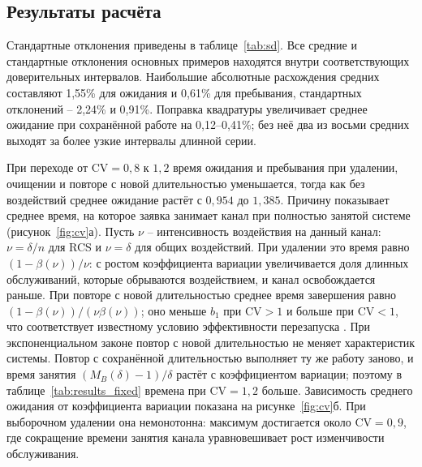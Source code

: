 \subsection{Результаты расчёта}



Стандартные отклонения приведены в таблице~\ref{tab:sd}. Все средние и стандартные отклонения основных примеров находятся внутри соответствующих доверительных интервалов. Наибольшие абсолютные расхождения средних составляют 1,55\% для ожидания и 0,61\% для пребывания, стандартных отклонений -- 2,24\% и 0,91\%. Поправка квадратуры увеличивает среднее ожидание при сохранённой работе на 0,12--0,41\%; без неё два из восьми средних выходят за более узкие интервалы длинной серии.

При переходе от \(\mathrm{CV}=0{,}8\) к \(1{,}2\) время ожидания и пребывания при удалении, очищении и повторе с новой длительностью уменьшается, тогда как без воздействий среднее ожидание растёт с \(0{,}954\) до \(1{,}385\). Причину показывает среднее время, на которое заявка занимает канал при полностью занятой системе (рисунок~\ref{fig:cv}а). Пусть \(\nu\) -- интенсивность воздействия на данный канал: \(\nu=\delta/n\) для RCS и \(\nu=\delta\) для общих воздействий. При удалении это время равно \((1-\beta(\nu))/\nu\): с ростом коэффициента вариации увеличивается доля длинных обслуживаний, которые обрываются воздействием, и канал освобождается раньше. При повторе с новой длительностью среднее время завершения равно \((1-\beta(\nu))/(\nu\beta(\nu))\); оно меньше \(b_1\) при \(\mathrm{CV}>1\) и больше при \(\mathrm{CV}<1\), что соответствует известному условию эффективности перезапуска \cite{pal2017,bonomo2022}. При экспоненциальном законе повтор с новой длительностью не меняет характеристик системы. Повтор с сохранённой длительностью выполняет ту же работу заново, и время занятия \((M_B(\delta)-1)/\delta\) растёт с коэффициентом вариации; поэтому в таблице~\ref{tab:results_fixed} времена при \(\mathrm{CV}=1{,}2\) больше. Зависимость среднего ожидания от коэффициента вариации показана на рисунке~\ref{fig:cv}б. При выборочном удалении она немонотонна: максимум достигается около \(\mathrm{CV}=0{,}9\), где сокращение времени занятия канала уравновешивает рост изменчивости обслуживания.

